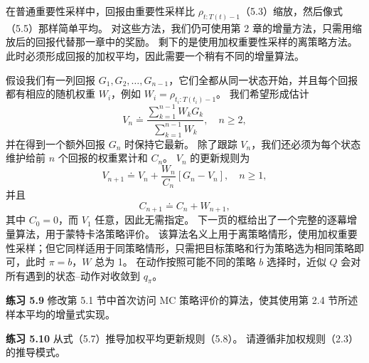 \documentclass[UTF8, 12pt, fontset=fandol, oneside]{ctexart}
\begin{document}
在普通重要性采样中，回报由重要性采样比 $\rho_{t:T(t)-1}$（5.3）缩放，然后像式（5.5）那样简单平均。
对这些方法，我们仍可使用第 2 章的增量方法，只需用缩放后的回报代替那一章中的奖励。
剩下的是使用加权重要性采样的离策略方法。
此时必须形成回报的加权平均，因此需要一个稍有不同的增量算法。

假设我们有一列回报 $G_1,G_2,\ldots,G_{n-1}$，它们全都从同一状态开始，并且每个回报都有相应的随机权重 $W_i$，例如 $W_i=\rho_{t_i:T(t_i)-1}$。
我们希望形成估计
\begin{equation}
V_n\doteq
\frac{\sum_{k=1}^{n-1}W_kG_k}{\sum_{k=1}^{n-1}W_k},
\quad n\ge 2,
\end{equation}
并在得到一个额外回报 $G_n$ 时保持它最新。
除了跟踪 $V_n$，我们还必须为每个状态维护给前 $n$ 个回报的权重累计和 $C_n$。
$V_n$ 的更新规则为
\begin{equation}
V_{n+1}\doteq V_n+\frac{W_n}{C_n}\left[G_n-V_n\right],
\quad n\ge 1,
\end{equation}
并且
\[
C_{n+1}\doteq C_n+W_{n+1},
\]
其中 $C_0=0$，而 $V_1$ 任意，因此无需指定。
下一页的框给出了一个完整的逐幕增量算法，用于蒙特卡洛策略评价。
该算法名义上用于离策略情形，使用加权重要性采样；但它同样适用于同策略情形，只需把目标策略和行为策略选为相同策略即可，此时 $\pi=b$，$W$ 总为 1。
在动作按照可能不同的策略 $b$ 选择时，近似 $Q$ 会对所有遇到的状态--动作对收敛到 $q_\pi$。

\noindent\textbf{练习 5.9}
修改第 5.1 节中首次访问 MC 策略评价的算法，使其使用第 2.4 节所述样本平均的增量式实现。

\noindent\textbf{练习 5.10}
从式（5.7）推导加权平均更新规则（5.8）。
请遵循非加权规则（2.3）的推导模式。

\begin{center}
\end{center}
\end{document}
